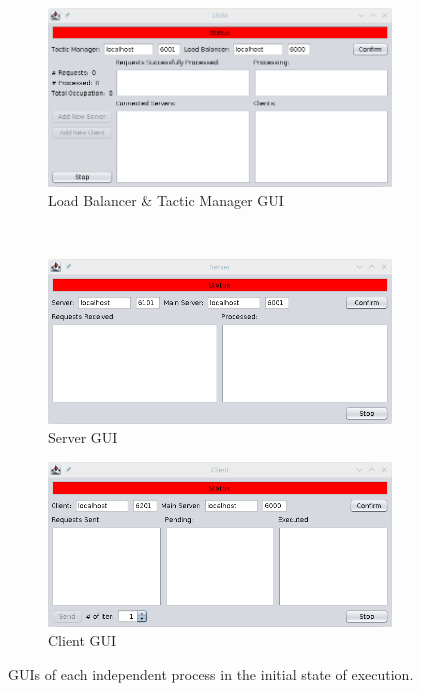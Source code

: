 \documentclass[12pt]{article}
\begin{document}
\begin{figure}[H]
  \centering
  \begin{subfigure}{.55\textwidth}
    \centering
    \includegraphics[width=.95\linewidth]{img/LBM_init.png}
    \caption{Load Balancer \& Tactic Manager GUI}
    \label{fig:LBM_init}
  \end{subfigure} \\
  \begin{subfigure}{.5\textwidth}
    \centering
    \includegraphics[width=.95\linewidth]{img/S_init.png}
    \caption{Server GUI}
    \label{fig:S_init}
  \end{subfigure}%
  \begin{subfigure}{.5\textwidth}
    \centering
    \includegraphics[width=.95\linewidth]{img/C_init.png}
    \caption{Client GUI}
    \label{fig:C_init}
  \end{subfigure}
  \caption{GUIs of each independent process in the initial state of execution.}
  \label{fig:GUIs_init}
\end{figure}
\end{document}
